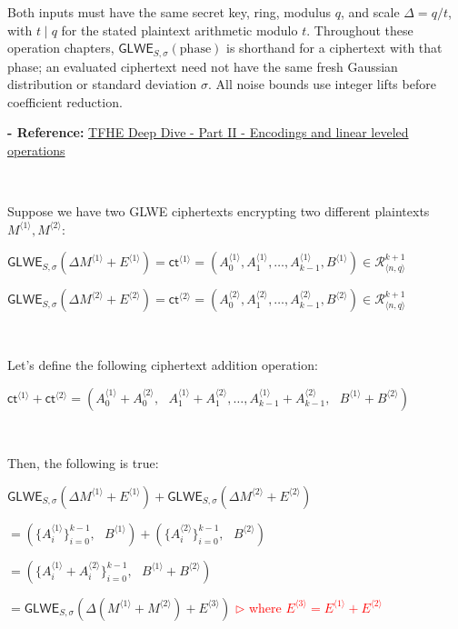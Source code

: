 Both inputs must have the same secret key, ring, modulus $q$, and scale $\Delta=q/t$, with $t\mid q$ for the stated plaintext arithmetic modulo $t$. Throughout these operation chapters, $\textsf{GLWE}_{S,\sigma}(\text{phase})$ is shorthand for a ciphertext with that phase; an evaluated ciphertext need not have the same fresh Gaussian distribution or standard deviation $\sigma$. All noise bounds use integer lifts before coefficient reduction.

\textbf{- Reference:} 
\href{https://www.zama.ai/post/tfhe-deep-dive-part-2}{TFHE Deep Dive - Part II - Encodings and linear leveled operations}~\cite{tfhe-2}


$ $

Suppose we have two GLWE ciphertexts encrypting two different plaintexts $M^{\langle 1 \rangle}, M^{\langle 2 \rangle}$:

$\textsf{GLWE}_{S, \sigma}(\Delta M^{\langle 1 \rangle} + E^{\langle 1 \rangle}) = \textsf{ct}^{\langle 1 \rangle} = ( A_0^{\langle 1 \rangle}, A_1^{\langle 1 \rangle}, \ldots, A_{k-1}^{\langle 1 \rangle}, B^{\langle 1 \rangle}) \in \mathcal{R}_{\langle n,q \rangle}^{k + 1}$

$\textsf{GLWE}_{S, \sigma}(\Delta M^{\langle 2 \rangle} + E^{\langle 2 \rangle}) = \textsf{ct}^{\langle 2 \rangle} = ( A_0^{\langle 2 \rangle}, A_1^{\langle 2 \rangle}, \ldots, A_{k-1}^{\langle 2 \rangle}, B^{\langle 2 \rangle}) \in \mathcal{R}_{\langle n,q \rangle}^{k + 1}$

$ $

\noindent Let's define the following ciphertext addition operation: 

$\textsf{ct}^{\langle 1 \rangle} + \textsf{ct}^{\langle 2 \rangle} = ( A_0^{\langle 1 \rangle} + A_0^{\langle 2 \rangle}, \text{ } A_1^{\langle 1 \rangle} + A_1^{\langle 2 \rangle}, \ldots, A_{k-1}^{\langle 1 \rangle} + A_{k-1}^{\langle 2 \rangle}, \text{ } B^{\langle 1 \rangle} + B^{\langle 2 \rangle} )$

$ $

\noindent Then, the following is true:

\begin{tcolorbox}[title={\textbf{\tboxlabel{\ref*{sec:glwe-add-cipher}} GLWE Homomorphic Addition}}]
$\textsf{GLWE}_{S, \sigma}(\Delta M^{\langle 1 \rangle} + E^{\langle 1 \rangle} ) + \textsf{GLWE}_{S, \sigma}(\Delta M^{\langle 2 \rangle} + E^{\langle 2 \rangle}) $

$ = ( \{A_i^{\langle 1 \rangle}\}_{i=0}^{k-1}, \text{ } B^{\langle 1 \rangle}) + (\{A_i^{\langle 2 \rangle}\}_{i=0}^{k-1}, \text{ } B^{\langle 2 \rangle}) $

$ = ( \{A_i^{\langle 1 \rangle} + A_i^{\langle 2 \rangle}\}_{i=0}^{k-1}, \text{ } B^{\langle 1 \rangle} + B^{\langle 2 \rangle} ) $

$= \textsf{GLWE}_{S, \sigma}(\Delta(M^{\langle 1 \rangle} + M^{\langle 2 \rangle}) + E^{\langle 3 \rangle})$ \textcolor{red}{ $\rhd$ where $E^{\langle 3 \rangle} = E^{\langle 1  \rangle} + E^{\langle 2 \rangle}$}
\end{tcolorbox}



